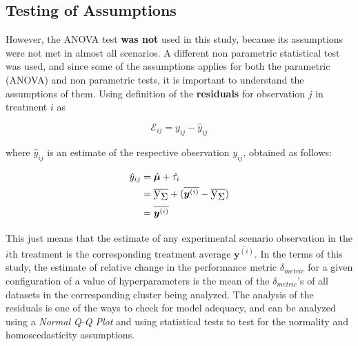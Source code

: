\subsection{Testing of Assumptions}

However, the ANOVA test \textbf{was not} used in this study, because its assumptions were not met in almost all scenarios. A different non parametric statistical test was used, and since some of the assumptions applies for both the parametric (ANOVA) and non parametric tests, it is important to understand the assumptions of them. Using \cite{montgomery2017design} definition of the \textbf{residuals} for observation $j$ in treatment $i$ as

\begin{equation}
    \mathcal{E}_{ij} = y_{ij} - \hat{y}_{ij}    
    \label{eq:sfm-residuals}
\end{equation}


where $\hat{y}_{ij}$ is an estimate of the respective observation $y_{ij}$, obtained as follows:

\begin{equation}    
    \begin{split}
        \hat{y}_{ij} & = \hat{\bm{\mu}} + \hat{\tau_i}\\
        & = \text{\Large$\overline{\text{\textup{y}}_\Sigma}$} + (\overline{\bm{y}^{(i)}} - \text{\Large$\overline{\text{\textup{y}}_\Sigma}$})\\
        & = \overline{\bm{y}^{(i)}}
    \end{split}
\end{equation}

This just means that the estimate of any experimental scenario observation in the $i$th treatment is the corresponding treatment average $\overline{\bm{y}^{(i)}}$. In the terms of this study, the estimate of relative change in the performance metric $\delta_{metric}$ for a given configuration of a value of hyperparameters is the mean of the $\delta_{metric}$'s of all datasets in the corresponding cluster being analyzed. The analysis of the residuals is one of the ways to check for model adequacy, and can be analyzed using a \textit{Normal Q-Q Plot} and using statistical tests to test for the normality and homoscedasticity assumptions.

